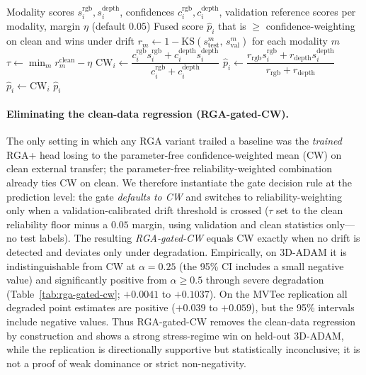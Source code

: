 \documentclass[10pt,conference]{IEEEtran}
\begin{document}
\begin{algorithm}[t]
\caption{RGA-gated-CW: gate defaults to the strong baseline}
\label{alg:gated-cw}
\begin{algorithmic}[1]
\Require Modality scores $s^{\text{rgb}}_i,s^{\text{depth}}_i$, confidences $c^{\text{rgb}}_i,c^{\text{depth}}_i$, validation reference scores per modality, margin $\eta$ (default $0.05$)
\Ensure Fused score $\hat p_i$ that is $\ge$ confidence-weighting on clean and wins under drift
\State $r_m \gets 1 - \mathrm{KS}(s^m_{\text{test}},\, s^m_{\text{val}})$ for each modality $m$ 
\State $\tau \gets \min_m r^{\text{clean}}_m - \eta$ 
\State $\text{CW}_i \gets \dfrac{c^{\text{rgb}}_i s^{\text{rgb}}_i + c^{\text{depth}}_i s^{\text{depth}}_i}{c^{\text{rgb}}_i + c^{\text{depth}}_i}$ 
 
    \State $\hat p_i \gets \dfrac{r_{\text{rgb}} s^{\text{rgb}}_i + r_{\text{depth}} s^{\text{depth}}_i}{r_{\text{rgb}} + r_{\text{depth}}}$ 
\Else
    \State $\hat p_i \gets \text{CW}_i$ 
\EndIf
\State \Return $\hat p_i$
\end{algorithmic}
\end{algorithm}

\paragraph{Eliminating the clean-data regression (RGA-gated-CW).} The only
setting in which any RGA variant trailed a baseline was the \emph{trained}
RGA+ head losing to the parameter-free confidence-weighted mean (CW) on
clean external transfer; the parameter-free reliability-weighted
combination already ties CW on clean. We therefore instantiate the gate
decision rule at the prediction level: the gate \emph{defaults to CW} and
switches to reliability-weighting only when a validation-calibrated drift
threshold is crossed ($\tau$ set to the clean reliability floor minus a
$0.05$ margin, using validation and clean statistics only---no test
labels). The resulting \emph{RGA-gated-CW} equals CW exactly when no drift
is detected and deviates only under degradation. Empirically, on 3D-ADAM it
is indistinguishable from CW at $\alpha=0.25$ (the 95\% CI includes a small
negative value) and significantly positive from $\alpha\ge0.5$ through
severe degradation (Table~\ref{tab:rga-gated-cw}; $+0.0041$ to $+0.1037$).
On the MVTec replication all degraded point estimates are positive
($+0.039$ to $+0.059$), but the 95\% intervals include negative values.
Thus RGA-gated-CW removes the clean-data regression by construction and
shows a strong stress-regime win on held-out 3D-ADAM, while the replication
is directionally supportive but statistically inconclusive; it is not a
proof of weak dominance or strict non-negativity.
\end{document}
